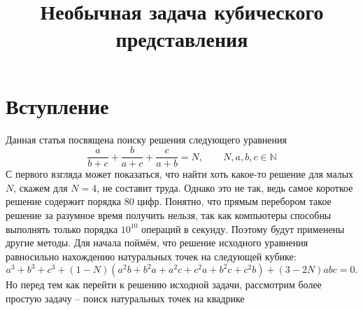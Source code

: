 \title{Необычная задача кубического представления}  
\date{}  
\author{}


\maketitle  
\section*{Вступление}

Данная статья посвящена поиску решения следующего уравнения
\[
    \frac{a} {b + c}  + \frac{b}{a + c} + \frac{c}{a + b} = N, \qquad N, a, b, c
    \in \mathbb{N}
\] 
С первого взгляда может показаться, что найти хоть какое-то решение для малых
\(N\), скажем для \(N = 4\), не составит труда. Однако это не так, ведь самое
короткое решение содержит порядка 80 цифр. Понятно, что прямым перебором такое
решение за разумное время получить нельзя, так как компьютеры способны
выполнять только порядка \(10^{10}\) операций в секунду. Поэтому будут применены 
другие методы. Для начала поймём, что решение исходного уравнения равносильно
нахождению натуральных точек на следующей кубике:
\[
    a^3 + b^3 + c^3 + (1 - N) (a^2 b + b^2 a + a^2 c + c^2 a + b^2 c + c^2 b)
    + (3 - 2 N) a b c = 0
.\] 
Но перед тем как перейти к решению исходной задачи, рассмотрим более простую
задачу -- поиск натуральных точек на квадрике 


